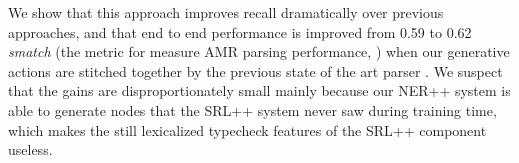 \documentclass[11pt]{article}
\newcommand\n[1]{\textit{#1}} %
\begin{document}
We show that this approach improves recall dramatically over previous approaches, and that end to end performance is improved from 0.59 to 0.62 \n{smatch} (the metric for measure AMR parsing performance, \cite{cai2013smatch-amr}) when our generative actions are stitched together by the previous state of the art parser \cite{2014flanigan-amr}.
We suspect that the gains are disproportionately small mainly because our NER++ system is able to generate nodes that the SRL++ system never saw during training time, which makes the still lexicalized typecheck features of the SRL++ component useless.






\end{document}
